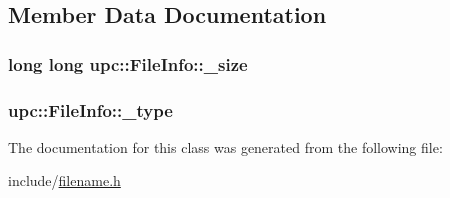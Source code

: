 \subsection{Member Data Documentation}
\subsubsection[{\texorpdfstring{\+\_\+size}{_size}}]{\setlength{\rightskip}{0pt plus 5cm}long long upc\+::\+File\+Info\+::\+\_\+size\hspace{0.3cm}{\ttfamily [private]}}\hypertarget{classupc_1_1FileInfo_ac09b1f0d020a595b0c6d5b582f5a1125}{}\label{classupc_1_1FileInfo_ac09b1f0d020a595b0c6d5b582f5a1125}
\subsubsection[{\texorpdfstring{\+\_\+type}{_type}}]{ upc\+::\+File\+Info\+::\+\_\+type\hspace{0.3cm}{\ttfamily [private]}}\hypertarget{classupc_1_1FileInfo_a61891fd0503949b6bb370556e2b8f3dc}{}\label{classupc_1_1FileInfo_a61891fd0503949b6bb370556e2b8f3dc}


The documentation for this class was generated from the following file\+:\begin{DoxyCompactItemize}
\item 
include/\hyperlink{filename_8h}{filename.\+h}\end{DoxyCompactItemize}
